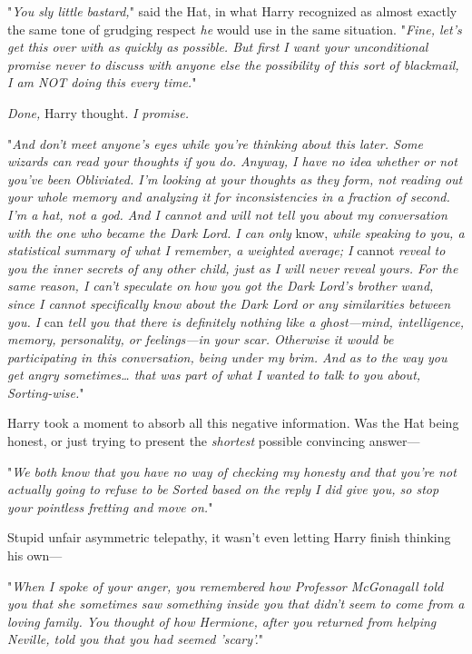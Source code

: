 "\emph{You sly little bastard,}" said the Hat, in what Harry recognized as 
almost exactly the same tone of grudging respect \emph{he} would use in the 
same situation. "\emph{Fine, let's get this over with as quickly as possible. 
But first I want your unconditional promise never to discuss with anyone else 
the possibility of this sort of blackmail, I am NOT doing this every time.}"

\emph{Done,} Harry thought. \emph{I promise.}

"\emph{And don't meet anyone's eyes while you're thinking about this later. 
Some wizards can read your thoughts if you do. Anyway, I have no idea whether 
or not you've been Obliviated. I'm looking at your thoughts as they form, not 
reading out your whole memory and analyzing it for inconsistencies in a 
fraction of second. I'm a hat, not a god. And I cannot and will not tell you 
about my conversation with the one who became the Dark Lord. I can only} 
know,\emph{ while speaking to you, a statistical summary of what I remember, a 
weighted average; I} cannot\emph{ reveal to you the inner secrets of any other 
child, just as I will never reveal yours. For the same reason, I can't 
speculate on how you got the Dark Lord's brother wand, since I cannot 
specifically know about the Dark Lord or any similarities between you. I} 
can\emph{ tell you that there is definitely nothing like a ghost---mind, 
intelligence, memory, personality, or feelings---in your scar. Otherwise it 
would be participating in this conversation, being under my brim. And as to the 
way you get angry sometimes{\ldots} that was part of what I wanted to talk to 
you about, Sorting-wise.}"

Harry took a moment to absorb all this negative information. Was the Hat being 
honest, or just trying to present the \emph{shortest} possible convincing 
answer---

"\emph{We both know that you have no way of checking my honesty and that you're 
not actually going to refuse to be Sorted based on the reply I did give you, so 
stop your pointless fretting and move on.}"

Stupid unfair asymmetric telepathy, it wasn't even letting Harry finish 
thinking his own---

"\emph{When I spoke of your anger, you remembered how Professor McGonagall told 
you that she sometimes saw something inside you that didn't seem to come from a 
loving family. You thought of how Hermione, after you returned from helping 
Neville, told you that you had seemed 'scary'.}"

